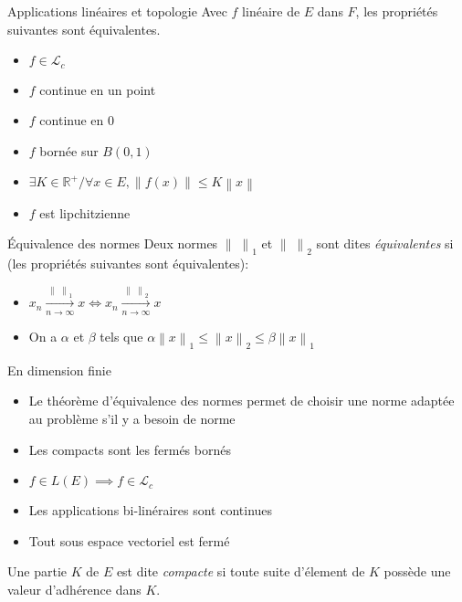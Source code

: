 \documentclass[french, a4paper, 11pt, twocolumn]{article}
\newcommand{\norme}[1]{\left\| #1\right\|}
\newcommand{\R}{\mathbb{R}}   %
\begin{document}
\begin{theoreme}{Applications linéaires et topologie}
  Avec $f$ linéaire de $E$ dans $F$, les propriétés suivantes sont équivalentes.
  \begin{itemize}[label=$\bullet$]
    \item $f\in \mathcal{L}_{c}$
        \item $f$ continue en un point
        \item $f$ continue en $0$
        \item $f$ bornée sur $B(0,1)$
        \item $\exists K \in \R^+/\forall x\in E, \norme{f(x)}\leq K\norme{x}$
        \item $f$ est lipchitzienne
    \end{itemize}
\end{theoreme}

\begin{theoreme}{Équivalence des normes}
  Deux normes $\norme{\;}_{1}$ et $\norme{\;}_{2}$ sont dites \emph{équivalentes} si (les propriétés suivantes sont équivalentes):
  \begin{itemize}[label=$\bullet$]
    \item $x_{n} \xrightarrow[n\rightarrow \infty]{\norme{\;}_{1}} x \iff x_{n} \xrightarrow[n\rightarrow \infty]{\norme{\;}_{2}}x$
    \item On a $\alpha$ et $\beta$ tels que $\alpha\norme{x}_{1}\leqslant\norme{x}_{2}\leqslant\beta\norme{x}_{1}$
  \end{itemize}
\end{theoreme}

\begin{theoreme}{En dimension finie}
    \begin{itemize}[label=$\bullet$]
        \item Le théorème d'équivalence des normes permet de choisir une norme adaptée au problème s'il y a besoin de norme
        \item Les compacts sont les fermés bornés
      \item $f \in L(E) \implies f \in \mathcal{L}_c$
        \item Les applications bi-linéraires sont continues
        \item Tout sous espace vectoriel est fermé
    \end{itemize}
\end{theoreme}

\begin{definition}
    Une partie $K$ de $E$ est dite \emph{compacte} si toute suite d'élement de $K$ possède une valeur d’adhérence dans $K$.
\end{definition}
\end{document}
